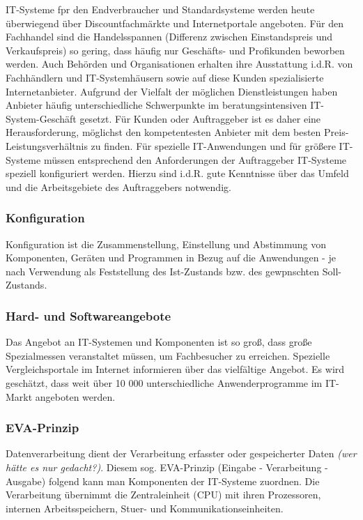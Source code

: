 \documentclass[a4paper, 12pt]{report}
\begin{document}
IT-Systeme fpr den Endverbraucher und Standardsysteme werden heute überwiegend
über Discountfachmärkte und Internetportale angeboten. Für den Fachhandel sind
die Handelsspannen (Differenz zwischen Einstandspreis und Verkaufspreis) so
gering, dass häufig nur Geschäfts- und Profikunden beworben werden. Auch
Behörden und Organisationen erhalten ihre Ausstattung i.d.R. von Fachhändlern
und IT-Systemhäusern sowie auf diese Kunden spezialisierte Internetanbieter.
Aufgrund der Vielfalt der möglichen Dienstleistungen haben Anbieter häufig
unterschiedliche Schwerpunkte im beratungsintensiven IT-System-Geschäft gesetzt.
Für Kunden oder Auftraggeber ist es daher eine Herausforderung, möglichst den
kompetentesten Anbieter mit dem besten Preis-Leistungsverhältnis zu finden.
Für spezielle IT-Anwendungen und für größere IT-Systeme müssen entsprechend den
Anforderungen der Auftraggeber IT-Systeme speziell konfiguriert werden. Hierzu
sind i.d.R. gute Kenntnisse über das Umfeld und die Arbeitsgebiete des
Auftraggebers notwendig. \\

\subsubsection{Konfiguration}

Konfiguration ist die Zusammenstellung, Einstellung und Abstimmung von
Komponenten, Geräten und Programmen in Bezug auf die Anwendungen - je nach
Verwendung als Feststellung des Ist-Zustands bzw. des gewpnschten Soll-Zustands.

\subsubsection{Hard- und Softwareangebote}

Das Angebot an IT-Systemen und Komponenten ist so groß, dass große Spezialmessen
veranstaltet müssen, um Fachbesucher zu erreichen. Spezielle Vergleichsportale
im Internet informieren über das vielfältige Angebot. Es wird geschätzt, dass
weit über 10 000 unterschiedliche Anwenderprogramme im IT-Markt angeboten
werden.

\subsubsection{EVA-Prinzip}

Datenverarbeitung dient der Verarbeitung erfasster oder gespeicherter Daten
\emph{(wer hätte es nur gedacht?)}. Diesem sog. EVA-Prinzip (Eingabe -
Verarbeitung - Ausgabe) folgend kann man Komponenten der IT-Systeme zuordnen.
Die Verarbeitung übernimmt die Zentraleinheit (CPU) mit ihren Prozessoren,
internen Arbeitsspeichern, Stuer- und Kommunikationseinheiten.
\end{document}
